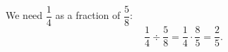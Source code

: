 We need $\dfrac{1}{4}$ as a fraction of $\dfrac{5}{8}$:
\[
\dfrac{1}{4}\div\dfrac{5}{8}=\dfrac{1}{4}\cdot\dfrac{8}{5}=\boxed{\dfrac{2}{5}}.
\]
